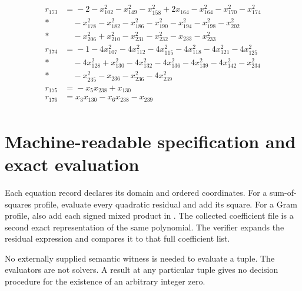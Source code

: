 \documentclass[11pt]{article}
\theoremstyle{remark}\newtheorem{remark}[theorem]{Remark}
\newcommand{\code}[1]{\texttt{\detokenize{#1}}}
\begin{document}
\begin{align*}
r_{173}&={}-2-x_{102}^{2}-x_{149}^{2}-x_{158}^{2}+2x_{164}-x_{164}^{2}-x_{170}^{2}-x_{174}^{2}\\*
&\quad{}-x_{178}^{2}-x_{182}^{2}-x_{186}^{2}-x_{190}^{2}-x_{194}^{2}-x_{198}^{2}-x_{202}^{2}\\*
&\quad{}-x_{206}^{2}+x_{210}^{2}-x_{231}^{2}-x_{232}^{2}-x_{233}-x_{233}^{2}\\[2pt]
r_{174}&={}-1-4x_{107}^{2}-4x_{112}^{2}-4x_{115}^{2}-4x_{118}^{2}-4x_{121}^{2}-4x_{125}^{2}\\*
&\quad{}-4x_{128}^{2}+x_{130}^{2}-4x_{132}^{2}-4x_{136}^{2}-4x_{139}^{2}-4x_{142}^{2}-x_{234}^{2}\\*
&\quad{}-x_{235}^{2}-x_{236}-x_{236}^{2}-4x_{239}^{2}\\[2pt]
r_{175}&={}-x_{5}x_{238}+x_{130}\\[2pt]
r_{176}&={}x_{3}x_{130}-x_{6}x_{238}-x_{239}\\[2pt]
\end{align*}
\endgroup

\section{Machine-readable specification and exact evaluation}

Each equation record declares its domain and ordered coordinates.
For a sum-of-squares profile, evaluate every quadratic residual and add
its square. For a Gram profile, also add each signed mixed product in
\code{gram_cross_terms}. The collected coefficient file is a second
exact representation of the same polynomial. The verifier expands the
residual expression and compares it to that full coefficient list.

No externally supplied semantic witness is needed to evaluate a tuple.
The evaluators are not solvers. A result at any particular tuple gives
no decision procedure for the existence of an arbitrary integer zero.
\end{document}
